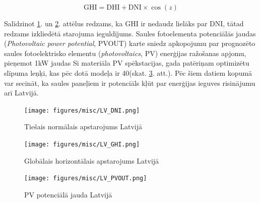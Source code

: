 \begin{equation}
\label{eq:YUCMWUH}
\text{GHI}=\text{DHI} + \text{DNI}\times \cos(z)
\end{equation}

Salīdzinot \ref{fig:lv_DNI}. un  \ref{fig:lv_GHI}. attēlus redzams, ka GHI ir nedaudz lielāks par DNI, tātad redzams izkliedētā starojuma ieguldījums. Saules fotoelementa potenciālās jaudas (\textit{Photovoltaic power potential}, PVOUT) karte sniedz apkopojumu par prognozēto saules fotoelektrisko elementu (\textit{photovoltaics}, PV) enerģijas ražošanas apjomu, pieņemot 1kW jaudas Si materiāla PV spēkstacijas, gada patēriņam optimizētu slīpuma leņķi, kas pēc dotā modeļa ir 40\textdegree (skat. \ref{fig:lv_PVOUT}. att.). Pēc šiem datiem kopumā var secināt, ka saules paneļiem ir potenciāls kļūt par enerģijas ieguves risinājumu arī Latvijā.

\begin{figure}[h]
    \centering
    \texttt{[image: figures/misc/LV\_DNI.png]}
    \caption{Tiešais normālais apstarojums Latvijā \cite{solargis}}
    \label{fig:lv_DNI}
\end{figure}
\begin{figure}[h]
    \centering
    \texttt{[image: figures/misc/LV\_GHI.png]}
    \caption{Globālais horizontālais apstarojums Latvijā \cite{solargis}}
    \label{fig:lv_GHI}
\end{figure}
\begin{figure}[t]
    \centering
    \texttt{[image: figures/misc/LV\_PVOUT.png]}
    \caption{PV potenciālā jauda Latvijā \cite{solargis}}
    \label{fig:lv_PVOUT}
\end{figure}